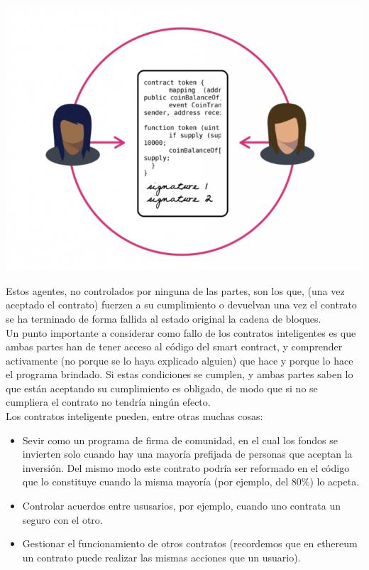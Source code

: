 \documentclass[11pt,a4paper]{article}
\begin{document}
\begin{center}
	
	\includegraphics[scale=.45]{images/smart.png}
\end{center}

Estos agentes, no controlados por ninguna de las partes, son los que, (una vez aceptado el contrato) fuerzen a su cumplimiento o devuelvan una vez el contrato se ha terminado de forma fallida al estado original la cadena de bloques.\\


Un punto importante a considerar como fallo de los contratos inteligentes es que ambas partes han de tener acceso al código del smart contract, y comprender activamente (no porque se lo haya explicado alguien) que hace y porque lo hace el programa brindado. Si estas condiciones se cumplen, y ambas partes saben lo que están aceptando su cumplimiento es obligado, de modo que si no se cumpliera el contrato no tendría ningún efecto.\\

Los contratos inteligente pueden, entre otras muchas cosas:
\begin{itemize}
	\item Sevir como un programa de firma de comunidad, en el cual los fondos se invierten solo cuando hay una mayoría prefijada de personas que aceptan la inversión. Del mismo modo este contrato podría ser reformado en el código que lo constituye cuando la misma mayoría (por ejemplo, del 80\%) lo acpeta.
	\item Controlar acuerdos entre ususarios, por ejemplo, cuando uno contrata un seguro con el otro.
	\item Gestionar el funcionamiento de otros contratos (recordemos que en ethereum un contrato puede realizar las mismas acciones que un usuario).
\end{itemize}
\end{document}
